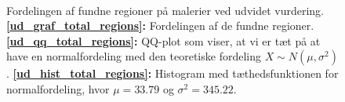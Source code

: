 {\begin{figure}[!h]
    \centering
    \\
    \caption[]{Fordelingen af fundne regioner på malerier ved udvidet
    vurdering.
    \textbf{\ref{ud_graf_total_regions}:} Fordelingen af de fundne
    regioner.
    \textbf{\ref{ud_qq_total_regions}:} QQ-plot som viser, at vi er tæt
    på at have en normalfordeling med den teoretiske fordeling $X \sim N(\mu,
    \sigma^2)$.
    \textbf{\ref{ud_hist_total_regions}:} Histogram med
    tæthedsfunktionen for normalfordeling, hvor $\mu = 33.79$ og
    $\sigma^2 = 345.22$.
    }
    \label{ud_total_regions_plots}
\end{figure}

}
